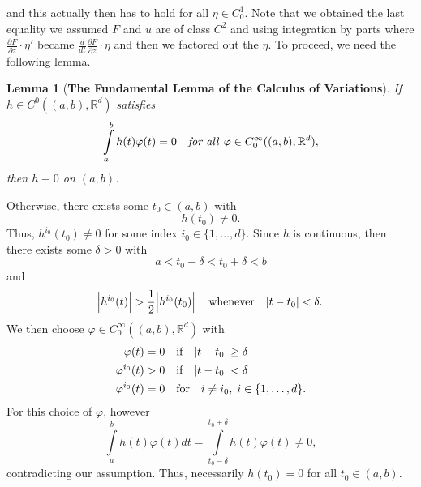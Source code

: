 \documentclass{article}
\makeatletter
\newtheorem{lemma}{Lemma}[theorem]
\theoremstyle{definition}
\theoremstyle{remark}
\let\oldproofname=\proofname
\renewcommand{\proofname}{\bf{\textit{\oldproofname}}}
\theoremstyle{definition}
\renewenvironment{proof}[1][\proofname]{\par
  \pushQED{\qed}%
  \normalfont \topsep6\p@\@plus6\p@\relax
  \list{}{\leftmargin=0mm
          \rightmargin=0mm
          \settowidth{\itemindent}{\itshape#1}%
          \labelwidth=\itemindent
          \parsep=0pt \listparindent=0mm%
  }
  \item[\hskip\labelsep
        \itshape
    #1\@addpunct{.}]\ignorespaces
}{%
  \popQED\endlist\@endpefalse
}
\makeatother
\begin{document}
        \noindent and this actually then has to hold for all $\eta\in C_0^1$. Note that we obtained the last equality we assumed $F$ and $u$ are of class $C^2$ and using integration by parts where $\frac{\partial F}{\partial z}\cdot\eta'$ became $\frac{d}{dt}\frac{\partial F}{\partial z}\cdot\eta$ and then we factored out the $\eta$. To proceed, we need the following lemma.
        \begin{lemma}[\textbf{The Fundamental Lemma of the Calculus of Variations}]\label{lem:2.0.1}
            If $h\in C^0((a,b),\mathbb{R}^d)$ satisfies
                \begin{equation*}
                    \int\limits_a^b h(t)\varphi(t)=0\quad\text{\textit{for all }}\varphi\in C_0^{\infty}((a,b),\mathbb{R}^d),
                \end{equation*}
            then $h\equiv 0$ on $(a,b)$.
        \end{lemma}
            \begin{proof}
                Otherwise, there exists some $t_0\in(a,b)$ with 
                    \begin{equation*}
                        h(t_0)\neq 0.
                    \end{equation*}
                \noindent Thus, $h^{i_0}(t_0)\neq 0$ for some index $i_0\in\{1,\dots,d\}$. Since $h$ is continuous, then there exists some $\delta>0$ with
                    \begin{equation*}
                        a<t_0-\delta<t_0+\delta<b
                    \end{equation*}
                \noindent and
                    \begin{equation*}
                        \abs{h^{i_0}(t)}>\frac{1}{2}\abs{h^{i_0}(t_0)}\quad\text{whenever}\quad\abs{t-t_0}<\delta.
                    \end{equation*}
                \noindent We then choose $\varphi\in C_0^{\infty}((a,b),\mathbb{R}^d)$ with 
                    \begin{equation*}
                        \begin{split}
                            \varphi(t)&=0\quad\text{if}\quad\abs{t-t_0}\geq\delta \\
                            \varphi^{i_0}(t)&>0\quad\text{if}\quad\abs{t-t_0}<\delta \\
                            \varphi^{i_0}(t)&=0\quad\text{for}\quad i\neq i_0,\;i\in\{1,\dots,d\}.
                        \end{split}
                    \end{equation*}
                \noindent For this choice of $\varphi$, however
                    \begin{equation*}
                        \int\limits_a^b h(t)\varphi(t)dt=\int\limits_{t_0-\delta}^{t_0+\delta}h(t)\varphi(t)\neq 0,
                    \end{equation*}
                contradicting our assumption. Thus, necessarily $h(t_0)=0$ for all $t_0\in(a,b)$.
            \end{proof}
\end{document}
